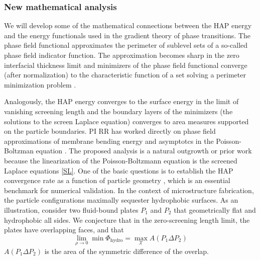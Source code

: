 
\subsubsection{New mathematical analysis}

We will develop some of the mathematical connections between the HAP energy and the energy functionals used in the gradient theory of phase transitions. 
The phase field functional approximates the perimeter of sublevel sets of a so-called phase field indicator function. 
The approximation becomes sharp in the zero interfacial thickness limit and minimizers of the phase field functional converge (after normalization) 
to the characteristic function of a set solving a perimeter minimization problem 
\cite{Modica87, MODICA1987487, LuMo89}. 

Analogously, the HAP energy converges to the surface energy in the limit of vanishing screening length 
and the boundary layers of the minimizers (the solutions to the screen Laplace equation) converges to 
area measures supported on the particle boundaries. 
PI RR has worked directly on phase field approximations of membrane bending energy 
\cite{0951-7715-18-3-016} and asymptotcs in the Poisson-Boltzman equation \cite{1531-3492_2006_2_357,Lee2018}.
The proposed analysis is a natural outgrowth or prior work because the linearization of the Poisson-Boltzmann equation is the screened Laplace equations \eqref{SL}.
One of the basic questions is to establish the HAP convergence rate as a function of particle geometry 
\cite{LuMo89}, which is an essential benchmark for numerical validation. 
In the context of microstructure fabrication, the particle configurations maximally sequester hydrophobic surfaces.  
As an illustration, consider two fluid-bound plates $P_1$ and $P_2$ that geometrically flat and hydrophobic all sides.
We conjecture that in the zero-screening length limit, the plates have overlapping faces, and that 
\begin{equation}
\lim_{\rho \to 0} \min \Phi_{\text{hydro}} = \max_{\mathcal{X}} A(P_1 \Delta P_2)
\end{equation}
$A(P_1 \Delta P_2)$ is the area of the symmetric difference of the overlap.  

